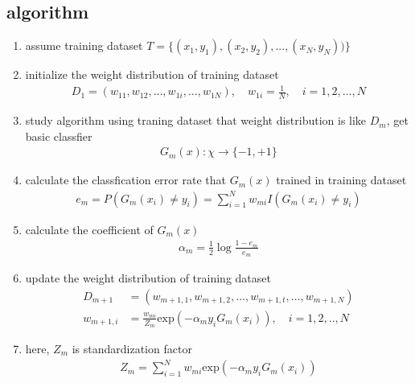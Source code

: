 \documentclass[12pt]{ctexart}%
\begin{document}
		\subsection{\quad algorithm}
			\begin{enumerate}
				\item assume training dataset $T = \{ (x_1, y_1), (x_2, y_2), ..., (x_N, y_N))\}$
				
				\item initialize the weight distribution of training dataset 
					\begin{align}
						D_1 = (w_{11}, w_{12}, ..., w_{1i}, ..., w_{1N}), \quad w_{1i} = \frac{1}{N}, \quad i=1,2,...,N
					\end{align}
					
				\item study algorithm using traning dataset that weight distribution is like $D_m$, get basic classfier
					\begin{align}
						G_m(x) : \chi \rightarrow \{ -1, +1\}
					\end{align}
					
				\item calculate the classfication error rate that $G_m(x)$ trained in training dataset
					\begin{align}
						e_m = P(G_m(x_i) \neq y_i) = \sum_{i=1}^{N} w_{mi} I(G_m(x_i) \ne y_i)
					\end{align}
					
				\item calculate the coefficient of $G_m(x)$
					\begin{align}
						\alpha_m = \frac{1}{2}\log{\frac{1-e_m}{e_m}}
					\end{align}
					
				\item update the weight distribution of training dataset
					\begin{align}
						D_{m+1} &= (w_{m+1, 1}, w_{m+1, 2}, ..., w_{m+1, t}, ..., w_{m+1, N})\\
						w_{m+1, i} &= \frac{w_{mi}}{Z_m} \text{exp} (-\alpha_m y_i G_m(x_i)), \quad i=1,2,..,N
					\end{align}
					
				\item here, $Z_m$ is standardization factor
					\begin{align}
						Z_m = \sum_{i=1}^{N} w_{mi} \text{exp} (-\alpha_m y_i G_m(x_i))
					\end{align}
					

\end{enumerate}
\end{document}
